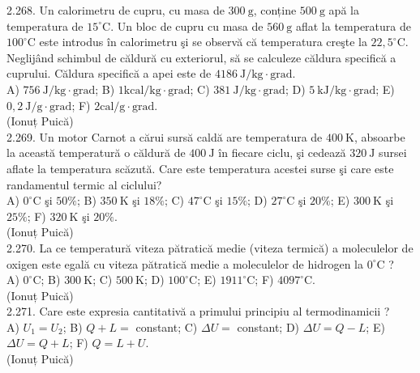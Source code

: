 2.268. Un calorimetru de cupru, cu masa de $300 \mathrm{~g}$, conține $500 \mathrm{~g}$ apă la temperatura de $15^{\circ} \mathrm{C}$. Un bloc de cupru cu masa de $560 \mathrm{~g}$ aflat la temperatura de $100^{\circ} \mathrm{C}$ este introdus în calorimetru şi se observă că temperatura creşte la $22,5^{\circ} \mathrm{C}$. Neglijând schimbul de căldură cu exteriorul, să se calculeze căldura specifică a cuprului. Căldura specifică a apei este de $4186 \mathrm{~J} / \mathrm{kg} \cdot \mathrm{grad}$.\\ A) $756 \mathrm{~J} / \mathrm{kg} \cdot \mathrm{grad}$; B) $1 \mathrm{kcal} / \mathrm{kg} \cdot \mathrm{grad}$; C) $381 \mathrm{~J} / \mathrm{kg} \cdot \mathrm{grad}$; D) $5 \mathrm{~kJ} / \mathrm{kg} \cdot \mathrm{grad}$; E) $0,2 \mathrm{~J} / \mathrm{g} \cdot \mathrm{grad}$; F) $2 \mathrm{cal} / \mathrm{g} \cdot \mathrm{grad}$.\\ (Ionuț Puică)\\

2.269. Un motor Carnot a cărui sursă caldă are temperatura de $400 \mathrm{~K}$, absoarbe la această temperatură o căldură de $400 \mathrm{~J}$ în fiecare ciclu, şi cedează $320 \mathrm{~J}$ sursei aflate la temperatura scăzută. Care este temperatura acestei surse şi care este randamentul termic al ciclului?\\ A) $0^{\circ} \mathrm{C}$ şi $50 \%$; B) $350 \mathrm{~K}$ şi $18 \%$; C) $47^{\circ} \mathrm{C}$ şi $15 \%$; D) $27^{\circ} \mathrm{C}$ şi $20 \%$; E) $300 \mathrm{~K}$ şi $25 \%$; F) $320 \mathrm{~K}$ şi $20 \%$.\\ (Ionuț Puică)\\

2.270. La ce temperatură viteza pătratică medie (viteza termică) a moleculelor de oxigen este egală cu viteza pătratică medie a moleculelor de hidrogen la $0^{\circ} \mathrm{C}$ ?\\ A) $0^{\circ} \mathrm{C}$; B) $300 \mathrm{~K}$; C) $500 \mathrm{~K}$; D) $100^{\circ} \mathrm{C}$; E) $1911^{\circ} \mathrm{C}$; F) $4097^{\circ} \mathrm{C}$.\\ (Ionuț Puică)\\

2.271. Care este expresia cantitativă a primului principiu al termodinamicii ?\\ A) $U_{1}=U_{2}$; B) $Q+L=$ constant; C) $\Delta U=$ constant; D) $\Delta U=Q-L$; E) $\Delta U=Q+L$; F) $Q=L+U$.\\ (Ionuț Puică)\\


